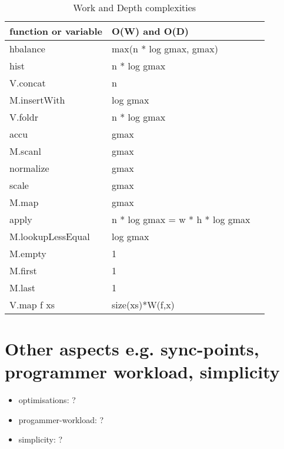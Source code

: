 \documentclass{article}
\begin{document}
      \paragraph{}
        \begin{table}[h]
          \caption{Work and Depth complexities}
          \label{timetable}
          \begin{tabular}{lll}
              \toprule
              function or variable &  O(W) and O(D) \\
              \midrule
              hbalance          & max(n * log gmax, gmax) \\
              \midrule
              hist              & n * log gmax\\
              V.concat          & n\\ 
              M.insertWith      & log gmax\\ 
              V.foldr           & n * log gmax \\ 
              \midrule
              accu              & gmax\\ 
              M.scanl           & gmax\\
              \midrule
              normalize         & gmax\\ 
              scale             & gmax\\ 
              M.map             & gmax\\ 
              \midrule
              apply             & n * log gmax = w * h * log gmax \\
              M.lookupLessEqual & log gmax \\ 
              \midrule
              M.empty           & 1\\ 
              M.first           & 1\\ 
              M.last            & 1\\
              \midrule
              V.map f xs        & size(xs)*W(f,x)\\ 
          \end{tabular}
        \end{table}
      
    \section{Other aspects \small{e.g. sync-points, programmer workload, simplicity}}
      \begin{itemize}
        \item optimisations:
          ?
        \item progammer-workload: ?
        \item simplicity: ?
      \end{itemize}
      
\end{document}
